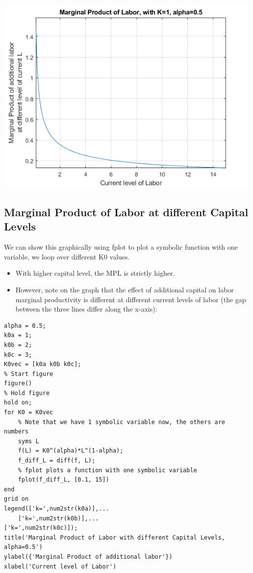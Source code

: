 \documentclass[
]{book}
\begin{document}
\includegraphics[width=5.20833in,height=\textheight]{img/derivative_cobb_douglas_images/figure_0.png}

\hypertarget{marginal-product-of-labor-at-different-capital-levels}{%
\subsection{Marginal Product of Labor at different Capital Levels}\label{marginal-product-of-labor-at-different-capital-levels}}

We can show this graphically using fplot to plot a symbolic function
with one variable, we loop over different K0 values.

\begin{itemize}
\item
  With higher capital level, the MPL is strictly higher.
\item
  However, note on the graph that the effect of additional capital on
  labor marginal productivity is different at different current levels
  of labor (the gap between the three lines differ along the x-axis):
\end{itemize}

\begin{verbatim}
alpha = 0.5;
k0a = 1;
k0b = 2;
k0c = 3;
K0vec = [k0a k0b k0c];
% Start figure
figure()
% Hold figure
hold on;
for K0 = K0vec
    % Note that we have 1 symbolic variable now, the others are numbers
    syms L
    f(L) = K0^(alpha)*L^(1-alpha);
    f_diff_L = diff(f, L);
    % fplot plots a function with one symbolic variable
    fplot(f_diff_L, [0.1, 15])
end
grid on
legend(['k=',num2str(k0a)],...
    ['k=',num2str(k0b)],...
['k=',num2str(k0c)]);
title('Marginal Product of Labor with different Capital Levels, alpha=0.5')
ylabel({'Marginal Product of additional labor'})
xlabel('Current level of Labor')
\end{verbatim}
\end{document}
